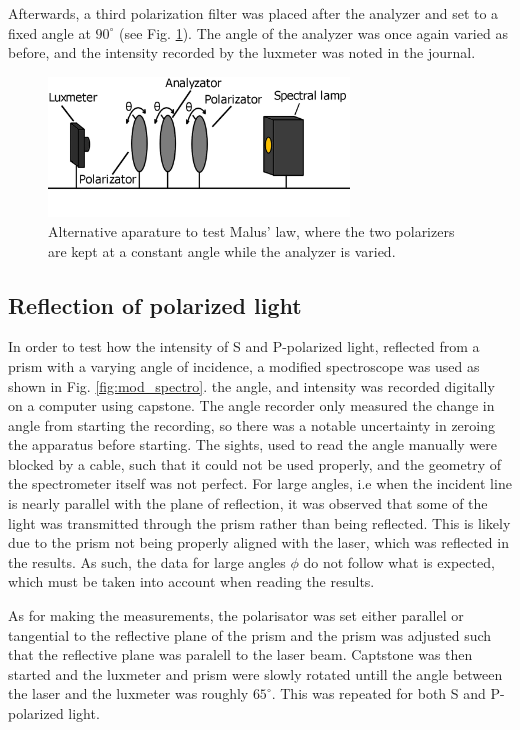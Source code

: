 \documentclass[11pt,a4paper, twocolumn]{article}
\begin{document}
    Afterwards, a third polarization filter was placed after the analyzer and set to a fixed angle at $90^\circ$ (see Fig. \ref{fig:lux_pola_ana_pola_lamp}). The angle of the analyzer was once again varied as before, and the intensity recorded by the luxmeter was noted in the journal.

    \begin{figure}[H]
      \center
      \includegraphics[width=8cm]{scripts/figs/diagram_3.png}
      \caption{Alternative aparature to test Malus' law, where the two polarizers are kept at a constant angle while the analyzer is varied.}
      \label{fig:lux_pola_ana_pola_lamp}
    \end{figure}

    \subsection{Reflection of polarized light\label{subsect:reflection_experimental}}
      In order to test how the intensity of S and P-polarized light, reflected from a prism with a varying angle of incidence, a modified spectroscope was used as shown in Fig. \ref{fig:mod_spectro}. the angle, and intensity was recorded digitally on a computer using capstone. The angle recorder only measured the change in angle from starting the recording, so there was a notable uncertainty in zeroing the apparatus before starting. The sights, used to read the angle manually were blocked by a cable, such that it could not be used properly, and the geometry of the spectrometer itself was not perfect. For large angles, i.e when the incident line is nearly parallel with the plane of reflection, it was observed that some of the light was transmitted through the prism rather than being reflected. This is likely due to the prism not being properly aligned with the laser, which was reflected in the results. As such, the data for large angles $\phi$ do not follow what is expected, which must be taken into account when reading the results.

      As for making the measurements, the polarisator was set either parallel or tangential to the reflective plane of the prism and the prism was adjusted such that the reflective plane was paralell to the laser beam. Captstone was then started and the luxmeter and prism were slowly rotated untill the angle between the laser and the luxmeter was roughly $65^\circ$. This was repeated for both S and P-polarized light.
\end{document}
